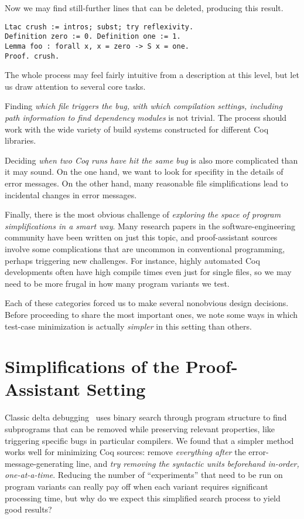 \documentclass[a4paper,USenglish,cleveref,autoref,thm-restate]{lipics-v2021}
\begin{document}
Now we may find still-further lines that can be deleted, producing this result.
\begin{verbatim}
Ltac crush := intros; subst; try reflexivity.
Definition zero := 0. Definition one := 1.
Lemma foo : forall x, x = zero -> S x = one.
Proof. crush.
\end{verbatim}

The whole process may feel fairly intuitive from a description at this level, but let us draw attention to several core tasks.

Finding \emph{which file triggers the bug, with which compilation settings, including path information to find dependency modules} is not trivial.
The process should work with the wide variety of build systems constructed for different Coq libraries.

Deciding \emph{when two Coq runs have hit the same bug} is also more complicated than it may sound.
On the one hand, we want to look for specifity in the details of error messages.
On the other hand, many reasonable file simplifications lead to incidental changes in error messages.

Finally, there is the most obvious challenge of \emph{exploring the space of program simplifications in a smart way}.
Many research papers in the software-engineering community have been written on just this topic, and proof-assistant sources involve some complications that are uncommon in conventional programming, perhaps triggering new challenges.
For instance, highly automated Coq developments often have high compile times even just for single files, so we may need to be more frugal in how many program variants we test.

Each of these categories forced us to make several nonobvious design decisions.
Before proceeding to share the most important ones, we note some ways in which test-case minimization is actually \emph{simpler} in this setting than others.


\section{Simplifications of the Proof-Assistant Setting}\label{sec:easier}

Classic delta debugging~\cite{Zeller2002} uses binary search through program structure to find subprograms that can be removed while preserving relevant properties, like triggering specific bugs in particular compilers.
We found that a simpler method works well for minimizing Coq sources: remove \emph{everything after} the error-message-generating line, and \emph{try removing the syntactic units beforehand in-order, one-at-a-time}.
Reducing the number of ``experiments'' that need to be run on program variants can really pay off when each variant requires significant processing time, but why do we expect this simplified search process to yield good results?
\end{document}
